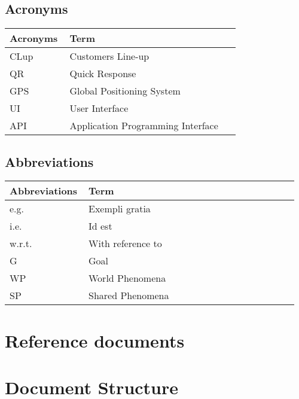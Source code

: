 \subsection{Acronyms}
\begin{center}
	\begin{tabular}{@{}p{0.25\linewidth} p{0.71\linewidth}@{}}
		\toprule
		\textbf{Acronyms} & \textbf{Term}\\
		\midrule
		CLup & Customers Line-up\\
		QR & Quick Response\\
		GPS & Global Positioning System\\
		UI & User Interface\\
		API & Application Programming Interface\\
		\bottomrule
	\end{tabular}
\end{center}

\subsection{Abbreviations}
\begin{center}
	\begin{tabular}{@{}p{0.25\linewidth} p{0.71\linewidth}@{}}
		\toprule
		\textbf{Abbreviations} & \textbf{Term}\\
		\midrule
		e.g. & Exempli gratia\\
		i.e. & Id est\\
		w.r.t. & With reference to\\
		G & Goal\\
		WP & World Phenomena\\
		SP & Shared Phenomena\\
		\bottomrule
	\end{tabular}
\end{center}

\section{Reference documents}

\section{Document Structure}
